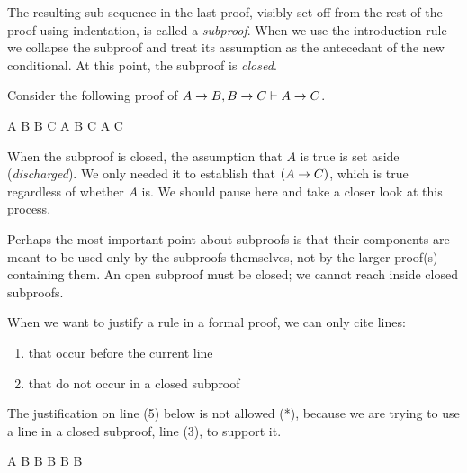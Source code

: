 The resulting sub-sequence in the last proof, visibly set off from the rest of
the proof using indentation, is called a \emph{subproof}. When we use the \eif
introduction rule we collapse the subproof and treat its assumption as the
antecedant of the new conditional. At this point, the subproof is \emph{closed}.

Consider the following proof of $A\rightarrow B, B \rightarrow C \vdash A \rightarrow C$.

\begin{fitchproof}
   {A \eif B} 
   {B \eif C} 
  \open
   {A}        
   {B}        
   {C}          
  \close
   {A \eif C} 
\end{fitchproof}

When the subproof is closed, the assumption that $A$ is true is set aside
(\emph{discharged}). We only needed it to establish that $(A \rightarrow C)$, which is
true regardless of whether $A$ is. We should pause here and take a closer look
at this process.

Perhaps the most important point about subproofs is that their components are
meant to be used only by the subproofs themselves, not by the larger proof(s)
containing them. An open subproof must be closed; we cannot reach inside closed
subproofs.

\begin{definition}
  \label{def:permissible-line-citations}
  When we want to justify a rule in a formal proof, we can only cite lines:
  \begin{enumerate}
  \item that occur before the current line
  \item that do not occur in a closed subproof
  \end{enumerate}  
\end{definition}

The justification on line (5) below is not allowed (*), because we are trying
to use a line in a closed subproof, line (3), to support it.

\begin{fitchproof}
   {A}        
  \open
   {B}        
   {B}        
  \close
   {B \eif B} 
   {B}        
\end{fitchproof}

